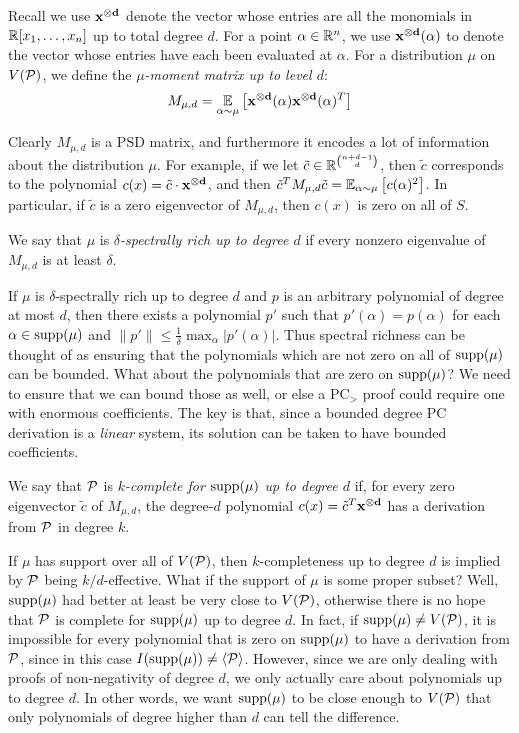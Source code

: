 \begin{definition}
Recall we use $\mathbf{x^{\otimes d}}$ denote the vector whose entries are all the monomials in $\mathbb R[x_1,\dots,x_n]$ up to total degree $d$. 
For a point $\alpha \in \mathbb R^n$, we use $\mathbf{x^{\otimes d}}(\alpha)$ to denote the vector whose entries have each been evaluated at $\alpha$.
For a distribution $\mu$ on $V(\mathcal P)$, we define the \emph{$\mu$-moment matrix up to level $d$}:
\[M_{\mu,d} = \operatorname*{\mathbb{E}}_{\alpha \sim \mu}\left[\mathbf{x^{\otimes d}}(\alpha)\mathbf{x^{\otimes d}}(\alpha)^T\right]\]
\end{definition}
Clearly $M_{\mu,d}$ is a PSD matrix, and furthermore it encodes a lot of information about the distribution $\mu$. For example, if we let $\tilde{c} \in \mathbb R^{\binom{n+d-1}{d}}$, then $\tilde{c}$ corresponds to the polynomial $c(x) = \tilde{c} \cdot \mathbf{x^{\otimes d}}$, and then $\tilde{c}^TM_{\mu,d}\tilde{c} = \operatorname*{\mathbb{E}}_{\alpha \sim \mu}\left[c(\alpha)^2\right]$.
In particular, if $\tilde{c}$ is a zero eigenvector of $M_{\mu,d}$, then $c(x)$ is zero on all of $S$.  
\begin{definition}
We say that $\mu$ is \emph{$\delta$-spectrally rich up to degree $d$} if every nonzero eigenvalue of $M_{\mu,d}$ is at least $\delta$. 
\end{definition}
If $\mu$ is $\delta$-spectrally rich up to degree $d$ and $p$ is an arbitrary polynomial of degree at most $d$, then there exists a polynomial $p'$ such that $p'(\alpha) = p(\alpha)$ for each $\alpha \in \operatorname{supp}(\mu)$ and $\|p'\| \leq \frac{1}{\delta} \max_\alpha |p'(\alpha)|$. Thus spectral richness can be thought of as ensuring that the polynomials which are not zero on all of $\operatorname{supp}(\mu)$ can be bounded. What about the polynomials that are zero on $\operatorname{supp}(\mu)$? We need to ensure that we can bound those as well, or else a PC$_>$ proof could require one with enormous coefficients. The key is that, since a bounded degree PC derivation is a \emph{linear} system, its solution can be taken to have bounded coefficients.
\begin{definition}
We say that $\mathcal P$ is \emph{$k$-complete for $\operatorname{supp}(\mu)$ up to degree $d$} if, for every zero eigenvector $\tilde{c}$ of $M_{\mu,d}$, the degree-$d$ polynomial $c(x) = \tilde{c}^T\mathbf{x^{\otimes d}}$ has a derivation from $\mathcal P$ in degree $k$.
\end{definition}
If $\mu$ has support over all of $V(\mathcal P)$, then $k$-completeness up to degree $d$ is implied by $\mathcal P$ being $k/d$-effective. 
What if the support of $\mu$ is some proper subset? Well, $\operatorname{supp}(\mu)$ had better at least be very close to $V(\mathcal P)$, otherwise there is no hope that $\mathcal P$ is complete for $\operatorname{supp}(\mu)$ up to degree $d$. In fact, if $\operatorname{supp}(\mu) \neq V(\mathcal P)$, it is impossible for every polynomial that is zero on $\operatorname{supp}(\mu)$ to have a derivation from $\mathcal P$, since in this case $I(\operatorname{supp}(\mu)) \neq \langle \mathcal P \rangle$. However, since we are only dealing with proofs of non-negativity of degree $d$, we only actually care about polynomials up to degree $d$. In other words, we want $\operatorname{supp}(\mu)$ to be close enough to $V(\mathcal P)$ that only polynomials of degree higher than $d$ can tell the difference.
